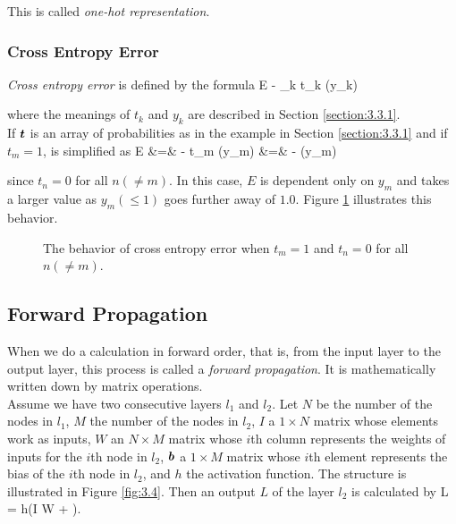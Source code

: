 \documentclass{article}
\theoremstyle{definition}
\newcommand{\sect}[1]{Section \ref{section:#1}}
\newcommand{\fig}[1]{Figure \ref{fig:#1}}
\begin{document}
This is called {\it one-hot representation}.

\subsubsection{Cross Entropy Error} \label{section:3.3.2}

{\it Cross entropy error} is defined by the formula
\begineq
E \equiv - \sum _k t_k \ln (y_k) 
\edeq

where the meanings of $t_k$ and $y_k$ are described in \sect{3.3.1}.\\

If $\bmt$ is an array of probabilities as in the example in \sect{3.3.1} and if $t_m = 1$,  is simplified as
\begineq
E &=& - t_m \ln (y_m) \no
&=& - \ln (y_m) 
\edeq

since $t_n = 0$ for all $n (\neq m)$. In this case, $E$ is dependent only on $y_m$ and takes a larger value as $y_m (\leq 1)$ goes further away of $1.0$. \fig{3.3} illustrates this behavior.

\begin{figure}[H]
    \centering
    \begin{subfigure}[H]{1.0\textwidth}
	\end{subfigure}
    \caption{The behavior of cross entropy error when $t_m = 1$ and $t_n = 0$ for all $n (\neq m)$.}
    \label{fig:3.3}
\end{figure}

\subsection{Forward Propagation} \label{section:3.4}

When we do a calculation in forward order, that is, from the input layer to the output layer, this process is called a {\it forward propagation}. It is mathematically written down by matrix operations.\\

Assume we have two consecutive layers $l_1$ and $l_2$. Let $N$ be the number of the nodes in $l_1$, $M$ the number of the nodes in $l_2$, $I$ a $1 \times N$ matrix whose elements work as inputs, $W$ an $N \times M$ matrix whose $i$th column represents the weights of inputs for the $i$th node in $l_2$, $\bmb$ a $1 \times M$ matrix whose $i$th element represents the bias of the $i$th node in $l_2$, and $h$ the activation function. The structure is illustrated in \fig{3.4}. Then an output $L$ of the layer $l_2$ is calculated by
\begineq
L = h(I W + \bmb). 
\edeq
\end{document}

